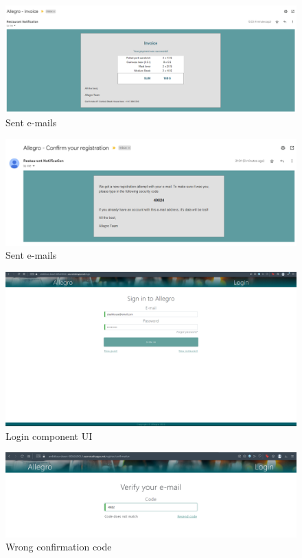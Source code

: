 \begin{figure}[ht]
	\centering
	\includegraphics[width=150mm, keepaspectratio]{figures/UI/7_Email_2.png}
	\caption{Sent e-mails} 
	\label{fig:UI_7}
\end{figure}

\begin{figure}[ht]
	\centering
	\includegraphics[width=150mm, keepaspectratio]{figures/UI/7_Email_3.png}
	\caption{Sent e-mails} 
	\label{fig:UI_7.1}
\end{figure}

\begin{figure}[ht]
	\centering
	\includegraphics[width=150mm, keepaspectratio]{figures/UI/8_Login.png}
	\caption{Login component UI} 
	\label{fig:UI_8}
\end{figure}

\begin{figure}[ht]
	\centering
	\includegraphics[width=150mm, keepaspectratio]{figures/UI/8_ConfirmFalse.png}
	\caption{Wrong confirmation code} 
	\label{fig:UI_8.2}
\end{figure}


